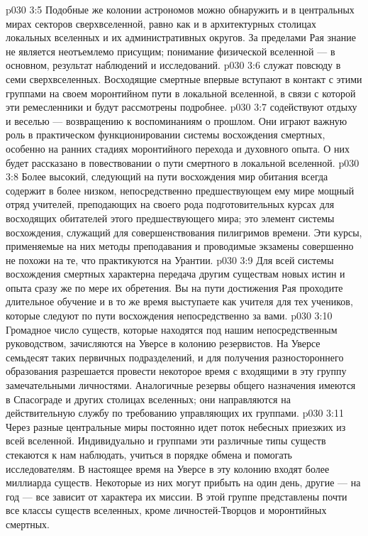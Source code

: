 \vs p030 3:5 Подобные же колонии астрономов можно обнаружить и в центральных мирах секторов сверхвселенной, равно как и в архитектурных столицах локальных вселенных и их административных округов. За пределами Рая знание не является неотъемлемо присущим; понимание физической вселенной --- в основном, результат наблюдений и исследований.
\vs p030 3:6 \bibnobreakspace {} служат повсюду в семи сверхвселенных. Восходящие смертные впервые вступают в контакт с этими группами на своем моронтийном пути в локальной вселенной, в связи с которой эти ремесленники и будут рассмотрены подробнее.
\vs p030 3:7 \bibnobreakspace {} содействуют отдыху и веселью --- возвращению к воспоминаниям о прошлом. Они играют важную роль в практическом функционировании системы восхождения смертных, особенно на ранних стадиях моронтийного перехода и духовного опыта. О них будет рассказано в повествовании о пути смертного в локальной вселенной.
\vs p030 3:8 \bibnobreakspace {} Более высокий, следующий на пути восхождения мир обитания всегда содержит в более низком, непосредственно предшествующем ему мире мощный отряд учителей, преподающих на своего рода подготовительных курсах для восходящих обитателей этого предшествующего мира; это элемент системы восхождения, служащий для совершенствования пилигримов времени. Эти курсы, применяемые на них методы преподавания и проводимые экзамены совершенно не похожи на те, что практикуются на Урантии.
\vs p030 3:9 Для всей системы восхождения смертных характерна передача другим существам новых истин и опыта сразу же по мере их обретения. Вы на пути достижения Рая проходите длительное обучение и в то же время выступаете как учителя для тех учеников, которые следуют по пути восхождения непосредственно за вами.
\vs p030 3:10 \bibnobreakspace {} Громадное число существ, которые находятся под нашим непосредственным руководством, зачисляются на Уверсе в колонию резервистов. На Уверсе семьдесят таких первичных подразделений, и для получения разностороннего образования разрешается провести некоторое время с входящими в эту группу замечательными личностями. Аналогичные резервы общего назначения имеются в Спасограде и других столицах вселенных; они направляются на действительную службу по требованию управляющих их группами.
\vs p030 3:11 \bibnobreakspace {} Через разные центральные миры постоянно идет поток небесных приезжих из всей вселенной. Индивидуально и группами эти различные типы существ стекаются к нам наблюдать, учиться в порядке обмена и помогать исследователям. В настоящее время на Уверсе в эту колонию входят более миллиарда существ. Некоторые из них могут прибыть на один день, другие --- на год --- все зависит от характера их миссии. В этой группе представлены почти все классы существ вселенных, кроме личностей\hyp{}Творцов и моронтийных смертных.
